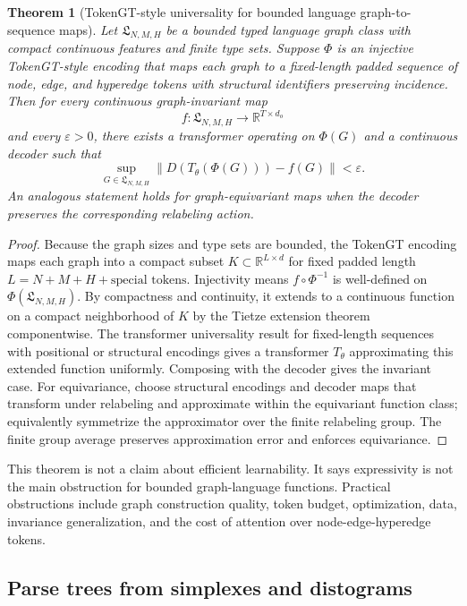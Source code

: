 \documentclass[11pt]{article}
\newtheorem{theorem}[definition]{Theorem}
\newcommand{\R}{\mathbb{R}}
\newcommand{\1}{\mathbf{1}}
\newcommand{\eps}{\varepsilon}
\begin{document}
\begin{theorem}[TokenGT-style universality for bounded language graph-to-sequence maps]
Let $\mathfrak{L}_{N,M,H}$ be a bounded typed language graph class with compact continuous features and finite type sets. Suppose $\Phi$ is an injective TokenGT-style encoding that maps each graph to a fixed-length padded sequence of node, edge, and hyperedge tokens with structural identifiers preserving incidence. Then for every continuous graph-invariant map
\[
f:\mathfrak{L}_{N,M,H}\to\R^{T\times d_o}
\]
and every $\eps>0$, there exists a transformer operating on $\Phi(G)$ and a continuous decoder such that
\[
\sup_{G\in\mathfrak{L}_{N,M,H}}\|D(T_\theta(\Phi(G)))-f(G)\|<\eps.
\]
An analogous statement holds for graph-equivariant maps when the decoder preserves the corresponding relabeling action.
\end{theorem}
\begin{proof}
Because the graph sizes and type sets are bounded, the TokenGT encoding maps each graph into a compact subset $K\subset\R^{L\times d}$ for fixed padded length $L=N+M+H+\text{special tokens}$. Injectivity means $f\circ\Phi^{-1}$ is well-defined on $\Phi(\mathfrak{L}_{N,M,H})$. By compactness and continuity, it extends to a continuous function on a compact neighborhood of $K$ by the Tietze extension theorem componentwise. The transformer universality result for fixed-length sequences with positional or structural encodings gives a transformer $T_\theta$ approximating this extended function uniformly. Composing with the decoder gives the invariant case. For equivariance, choose structural encodings and decoder maps that transform under relabeling and approximate within the equivariant function class; equivalently symmetrize the approximator over the finite relabeling group. The finite group average preserves approximation error and enforces equivariance.
\end{proof}

This theorem is not a claim about efficient learnability. It says expressivity is not the main obstruction for bounded graph-language functions. Practical obstructions include graph construction quality, token budget, optimization, data, invariance generalization, and the cost of attention over node-edge-hyperedge tokens.

\subsection{Parse trees from simplexes and distograms}
\end{document}
